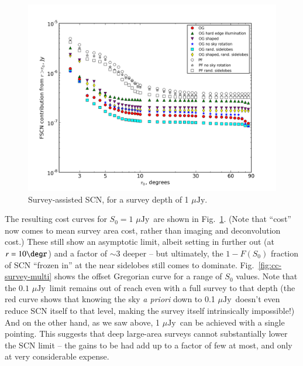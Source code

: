 \documentclass{aa}
\newcommand{\uJy}{$\mu\mathrm{Jy}$}
\begin{document}
\begin{figure}
\includegraphics[width=\columnwidth]{costcurve-survey-1uJy}
\caption{\label{fig:cc-survey-1uJy}Survey-assisted SCN, for a survey depth of 1 \uJy.}
\end{figure}

The resulting cost curves for $S_0=1$ \uJy\ are shown in Fig.~\ref{fig:cc-survey-1uJy}. (Note that ``cost'' now comes to mean survey area cost, rather than imaging and deconvolution cost.) These still show an asymptotic limit, albeit setting in further out (at $r=10\degr$) and a factor of $\sim3$ deeper -- but ultimately, the $1-F(S_0)$ fraction of SCN ``frozen in'' at the near sidelobes still comes to dominate. Fig.~\ref{fig:cc-survey-multi} shows the offset Gregorian curve for a range of $S_0$ values. Note that the $0.1$ \uJy\ limit remains out of reach even with a full survey to that depth (the red curve shows that knowing the sky {\em a priori} down to 0.1 \uJy\ doesn't even reduce SCN itself to that level, making the survey itself intrinsically impossible!) And on the other hand, as we saw above, 1 \uJy\ can be achieved with a single pointing. This suggests that deep large-area surveys cannot substantially lower the SCN limit -- the gains to be had add up to a factor of few at most, and only at very considerable expense.
\end{document}
